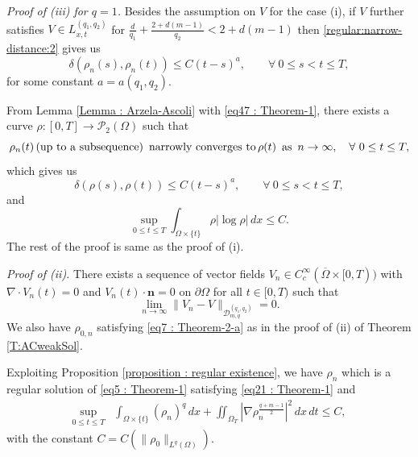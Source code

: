 \documentclass{amsart}
\numberwithin{equation}{section}
\begin{document}
{\it Proof of (iii) for $q=1$.}  Besides the assumption on $V$ for the case (i), if $V$ further satisfies $V\in L_{x,t}^{(q_1, q_2)}$ for $\frac{d}{q_1}+\frac{2+ d(m-1)}{q_2}<  2+ d(m-1) $
 then \eqref{regular:narrow-distance:2} gives us 
\begin{equation}\label{eq47 : Theorem-1}
\delta(\rho_n(s), \rho_n(t)) \leq C(t-s)^{a} , \qquad  \forall ~0 \leq s < t \leq T,
\end{equation}
for some constant $a=a(q_1, q_2)$. 

From Lemma \ref{Lemma : Arzela-Ascoli} with \eqref{eq47 : Theorem-1}, there exists a curve $\rho : [0, T] \rightarrow \mathcal{P}_2(\Omega)$ such that
\begin{equation}\label{eq55 : Theorem-1}
\rho_n(t) \,\mbox{(up to a subsequence) \,narrowly converges to}\, \rho(t) \,~\mbox{as}~ \, n \rightarrow \infty, \quad \forall \ 0\leq t \leq T,
\end{equation}
which gives us 
\begin{equation}\label{eq56 : Theorem-1}
\delta(\rho(s), \rho(t)) \leq C(t-s)^{a} , \qquad  \forall ~0 \leq s < t \leq T,
\end{equation}
and
 \begin{equation*}
\sup_{0\leq t \leq T}\int_{\Omega \times \{ t\}}\rho |\log \rho|  \,dx \leq C.
\end{equation*}
The rest of the proof is same as the proof of (i).

{\it Proof of (ii).}
There exists a sequence of vector fields $V_n\in C^\infty_c(\overline{\Omega}\times[0,T)) $ with $\nabla \cdot V_n(t)=0$ and $V_n(t)\cdot \mathbf{n}=0$ on $\partial\Omega$ for all $t\in[0,T)$
such that
\begin{equation*}\label{eq51 : Theorem-1}
\lim_{n \rightarrow \infty}\|V_n - V \|_{\mathcal{D}_{m,q}^{(q_1,q_2)} } =0.
\end{equation*}
We also have $\rho_{0,n}$ satisfying \eqref{eq7 : Theorem-2-a} as in the proof of (ii) of Theorem \ref{T:ACweakSol}. 

Exploiting Proposition \ref{proposition : regular existence}, we have $\rho_n$ which is a regular solution of
\eqref{eq5 : Theorem-1} satisfying \eqref{eq21 : Theorem-1} and 
\begin{equation*}
\begin{aligned}
\sup_{0\leq t \leq T} &\int_{\Omega\times \{t\}}  (\rho_n)^q   \,dx
 +  \iint_{\Omega_T} \left |\nabla \rho_n^{\frac{q+m-1}{2}}\right |^2  \,dx\,dt \leq C,
\end{aligned}
\end{equation*}
with the constant $C=C (\|\rho_0\|_{L^{q}(\Omega)})$. 
\end{document}
